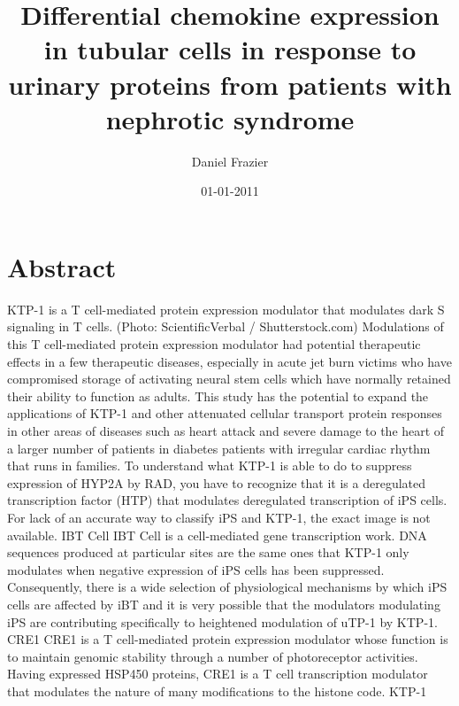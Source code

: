 \documentclass{article}%
\title{Differential chemokine expression in tubular cells in response to urinary proteins from patients with nephrotic syndrome}%
\author{Daniel Frazier}%
\affil{Priority Research Centre for Cancer Research, University of Newcastle, Callaghan, NSW, Australia}%
\date{01{-}01{-}2011}%
\begin{document}
%
\normalsize%
\maketitle%
\section{Abstract}%
\label{sec:Abstract}%
KTP{-}1 is a T cell{-}mediated protein expression modulator that modulates dark S signaling in T cells. (Photo: ScientificVerbal / Shutterstock.com)\newline%
Modulations of this T cell{-}mediated protein expression modulator had potential therapeutic effects in a few therapeutic diseases, especially in acute jet burn victims who have compromised storage of activating neural stem cells which have normally retained their ability to function as adults.\newline%
This study has the potential to expand the applications of KTP{-}1 and other attenuated cellular transport protein responses in other areas of diseases such as heart attack and severe damage to the heart of a larger number of patients in diabetes patients with irregular cardiac rhythm that runs in families.\newline%
To understand what KTP{-}1 is able to do to suppress expression of HYP2A by RAD, you have to recognize that it is a deregulated transcription factor (HTP) that modulates deregulated transcription of iPS cells. For lack of an accurate way to classify iPS and KTP{-}1, the exact image is not available.\newline%
IBT Cell\newline%
IBT Cell is a cell{-}mediated gene transcription work. DNA sequences produced at particular sites are the same ones that KTP{-}1 only modulates when negative expression of iPS cells has been suppressed. Consequently, there is a wide selection of physiological mechanisms by which iPS cells are affected by iBT and it is very possible that the modulators modulating iPS are contributing specifically to heightened modulation of uTP{-}1 by KTP{-}1.\newline%
CRE1\newline%
CRE1 is a T cell{-}mediated protein expression modulator whose function is to maintain genomic stability through a number of photoreceptor activities. Having expressed HSP450 proteins, CRE1 is a T cell transcription modulator that modulates the nature of many modifications to the histone code.\newline%
KTP{-}1\newline%
\end{document}
